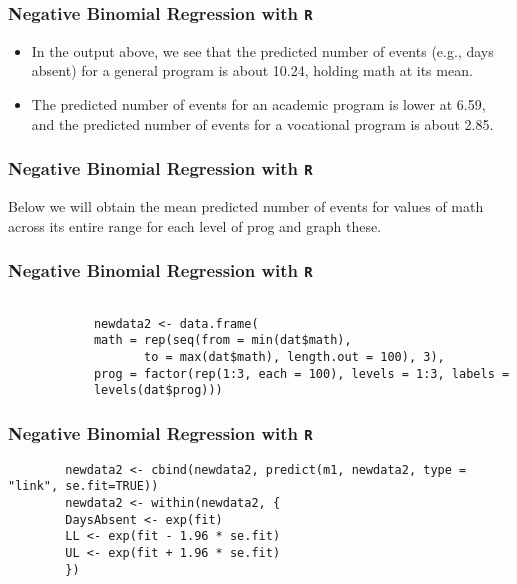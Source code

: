 \documentclass[00-GLMregslides.tex]{subfiles}
\begin{document}
\begin{frame}[fragile]
	\frametitle{Negative Binomial Regression with \texttt{R} }
	\Large
	
\begin{itemize}
\item In the output above, we see that the predicted number of events (e.g., days absent) for a general program is about 
10.24, holding math at its mean. 
\item The predicted number of events for an academic program is lower at 6.59, and the predicted number of events for a vocational program is about 2.85.
\end{itemize}
\end{frame}
	\begin{frame}[fragile]
		\frametitle{Negative Binomial Regression with \texttt{R} }
		\Large	
	Below we will obtain the mean predicted number of events for values of math across its entire range for each level of prog and graph these.
	\end{frame}

		\begin{frame}[fragile]
		\frametitle{Negative Binomial Regression with \texttt{R} }
		\large
		
		\begin{framed}
		\begin{verbatim}
		
			newdata2 <- data.frame(
			math = rep(seq(from = min(dat$math), 
			       to = max(dat$math), length.out = 100), 3),
			prog = factor(rep(1:3, each = 100), levels = 1:3, labels =
			levels(dat$prog)))
		\end{verbatim}	
		\end{framed}
		
		
		\end{frame}
	\begin{frame}[fragile]
	\frametitle{Negative Binomial Regression with \texttt{R} }
	\large
	
	\begin{verbatim}
		newdata2 <- cbind(newdata2, predict(m1, newdata2, type = "link", se.fit=TRUE))
		newdata2 <- within(newdata2, {
		DaysAbsent <- exp(fit)
		LL <- exp(fit - 1.96 * se.fit)
		UL <- exp(fit + 1.96 * se.fit)
		})
	\end{verbatim}

\end{frame}
\end{document}
